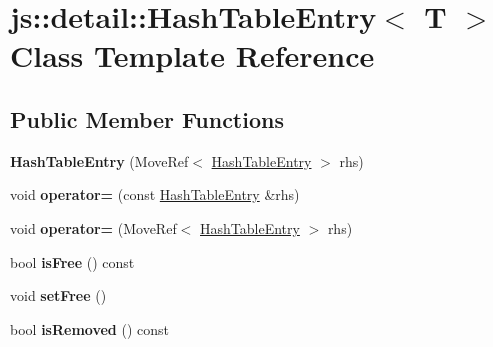 \hypertarget{classjs_1_1detail_1_1_hash_table_entry}{\section{js\-:\-:detail\-:\-:Hash\-Table\-Entry$<$ T $>$ Class Template Reference}
\label{classjs_1_1detail_1_1_hash_table_entry}
}
\subsection*{Public Member Functions}
\begin{DoxyCompactItemize}
\item 
\hypertarget{classjs_1_1detail_1_1_hash_table_entry_a4f9714f12ec963a46e6dc1370fec6767}{{\bfseries Hash\-Table\-Entry} (Move\-Ref$<$ \hyperlink{classjs_1_1detail_1_1_hash_table_entry}{Hash\-Table\-Entry} $>$ rhs)}\label{classjs_1_1detail_1_1_hash_table_entry_a4f9714f12ec963a46e6dc1370fec6767}

\item 
\hypertarget{classjs_1_1detail_1_1_hash_table_entry_a6e4ca7beb36f40063b4e74744ebac63b}{void {\bfseries operator=} (const \hyperlink{classjs_1_1detail_1_1_hash_table_entry}{Hash\-Table\-Entry} \&rhs)}\label{classjs_1_1detail_1_1_hash_table_entry_a6e4ca7beb36f40063b4e74744ebac63b}

\item 
\hypertarget{classjs_1_1detail_1_1_hash_table_entry_a093320407233e1e0d2842a91733020b4}{void {\bfseries operator=} (Move\-Ref$<$ \hyperlink{classjs_1_1detail_1_1_hash_table_entry}{Hash\-Table\-Entry} $>$ rhs)}\label{classjs_1_1detail_1_1_hash_table_entry_a093320407233e1e0d2842a91733020b4}

\item 
\hypertarget{classjs_1_1detail_1_1_hash_table_entry_a8e8d24f664a2968f5b275b6d316ebea9}{bool {\bfseries is\-Free} () const }\label{classjs_1_1detail_1_1_hash_table_entry_a8e8d24f664a2968f5b275b6d316ebea9}

\item 
\hypertarget{classjs_1_1detail_1_1_hash_table_entry_a55ae904f319921388d7b454330d4a220}{void {\bfseries set\-Free} ()}\label{classjs_1_1detail_1_1_hash_table_entry_a55ae904f319921388d7b454330d4a220}

\item 
\hypertarget{classjs_1_1detail_1_1_hash_table_entry_a281e1920be39b5127f4248515ae64269}{bool {\bfseries is\-Removed} () const }\label{classjs_1_1detail_1_1_hash_table_entry_a281e1920be39b5127f4248515ae64269}


\end{DoxyCompactItemize}
